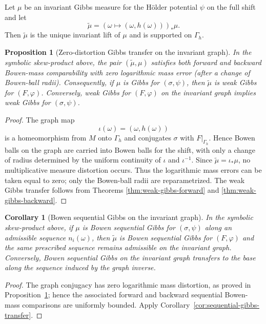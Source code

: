 \documentclass[11pt,a4paper]{article}
\newtheorem{proposition}[theorem]{Proposition}
\newtheorem{corollary}[theorem]{Corollary}
\begin{document}
Let $\mu$ be an invariant Gibbs measure for the H\"older potential
$\psi$ on the full shift and let
\[
\widetilde\mu=(\omega\mapsto(\omega,h(\omega)))_*\mu.
\]
Then $\widetilde\mu$ is the unique invariant lift of $\mu$ and is supported
on $\Gamma_h$.

\begin{proposition}[Zero-distortion Gibbs transfer on the invariant graph]
\label{prop:symbolic-gibbs-example}
In the symbolic skew-product above, the pair
$(\widetilde\mu,\mu)$ satisfies both forward and backward Bowen-mass
comparability with zero logarithmic mass error (after a change of Bowen-ball
radii). Consequently, if $\mu$ is Gibbs
for $(\sigma,\psi)$, then $\widetilde\mu$ is weak Gibbs for $(F,\varphi)$.
Conversely, weak Gibbs for $(F,\varphi)$ on the invariant graph implies weak
Gibbs for $(\sigma,\psi)$.
\end{proposition}

\begin{proof}
The graph map
\[
\iota(\omega)=(\omega,h(\omega))
\]
is a homeomorphism from $M$ onto $\Gamma_h$ and conjugates $\sigma$ with
$F|_{\Gamma_h}$. Hence Bowen balls on the graph are carried into Bowen balls
for the shift, with only a change of radius determined by the uniform
continuity of $\iota$ and $\iota^{-1}$. Since
$\widetilde\mu=\iota_*\mu$, no multiplicative measure distortion occurs.
Thus the logarithmic mass errors can be taken equal to zero; only the Bowen-ball radii are reparametrized.
The weak Gibbs transfer follows from Theorems
\ref{thm:weak-gibbs-forward} and \ref{thm:weak-gibbs-backward}.
\end{proof}

\begin{corollary}[Bowen sequential Gibbs on the invariant graph]
\label{cor:symbolic-sequential-gibbs}
In the symbolic skew-product above, if $\mu$ is Bowen sequential Gibbs for
$(\sigma,\psi)$ along an admissible sequence $n_i(\omega)$, then
$\widetilde\mu$ is Bowen sequential Gibbs for $(F,\varphi)$ and the same
prescribed sequence remains admissible on the invariant graph. Conversely,
Bowen sequential Gibbs on the invariant graph transfers to the base along the
sequence induced by the graph inverse.
\end{corollary}

\begin{proof}
The graph conjugacy has zero logarithmic mass distortion, as proved in
Proposition~\ref{prop:symbolic-gibbs-example}; hence the associated forward
and backward sequential Bowen-mass comparisons are uniformly bounded. Apply
Corollary~\ref{cor:sequential-gibbs-transfer}.
\end{proof}
\end{document}
